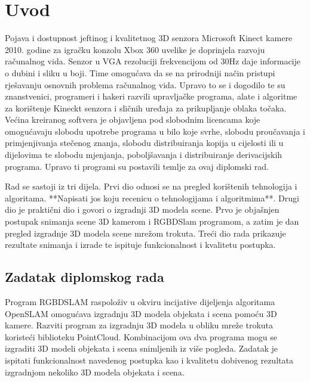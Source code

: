 \newpage

\setcounter{page}{1}
\setcounter{figure}{0}
\section{Uvod}%
\label{sec:Uvod}


Pojava i dostupnost jeftinog i kvalitetnog 3D senzora Microsoft Kinect
kamere 2010. godine za igračku konzolu Xbox 360 uvelike je doprinjela
razvoju računalnog vida. Senzor u VGA rezoluciji frekvencijom od 30Hz
daje informacije o dubini i sliku u boji. Time omogućava da se na
prirodniji način pristupi rješavanju osnovnih problema računalnog vida.
Upravo to se i dogodilo te su znanstvenici, programeri i hakeri 
razvili upravljačke programa, alate i algoritme za korištenje Kineckt
senzora i sličnih uređaja za prikupljanje oblaka točaka. Većina
kreiranog softvera je objavljena pod slobodnim licencama koje
omogućavaju slobodu upotrebe programa u bilo koje svrhe, slobodu
proučavanja i primjenjivanja stečenog znanja, slobodu distribuiranja
kopija u cijelosti ili u dijelovima te slobodu mjenjanja, poboljšavanja
i distribuiranje derivacijskih programa. Upravo ti programi su postavili
temlje za ovaj diplomski rad.

Rad se sastoji iz tri dijela. Prvi dio odnosi se na pregled korištenih
tehnologija i algoritama. **Napisati jos koju recenicu o tehnologijama i
algoritmima**. Drugi dio je praktični dio i govori o izgradnji 3D modela
scene. Prvo je objašnjen postupak snimanja scene 3D kamerom i RGBDSlam
programom, a zatim je dan pregled izgradnje 3D modela scene mrežom
trokuta. Treći dio rada prikazuje rezultate snimanja i izrade te ispituje
funkcionalnost i kvalitetu postupka.

\newpage
\subsection{Zadatak diplomskog rada} %
\label{sub:Zadatak diplomskog rada}

Program RGBDSLAM raspoloživ u okviru incijative dijeljenja algoritama
OpenSLAM omogućava izgradnju 3D modela objekata i scena pomoću 3D
kamere. Razviti program za izgradnju 3D modela u obliku mreže trokuta
koristeći biblioteku PointCloud. Kombinacijom ova dva programa mogu se
izgraditi 3D modeli objekata i scena snimljenih iz više pogleda. Zadatak
je ispitati funkcionalnost navedenog postupka kao i kvalitetu dobivenog
rezultata izgradnjom nekoliko 3D modela objekata i scena.

